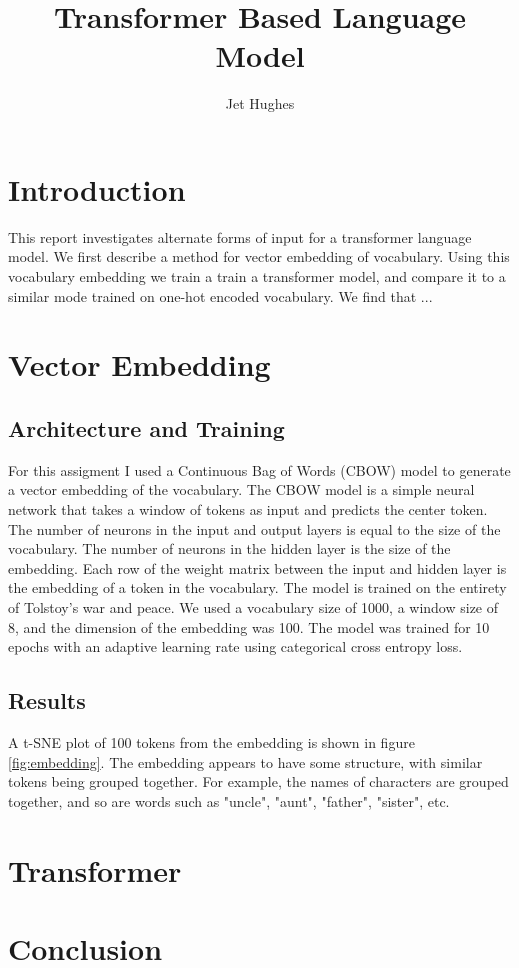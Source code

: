 \documentclass[a4paper, 11pt]{article}
\title{Transformer Based Language Model}
\author{Jet Hughes}
\date{}
\begin{document}
\maketitle


\section{Introduction}
This report investigates alternate forms of input for a transformer language model. We first describe a method for vector embedding of vocabulary. Using this vocabulary embedding we train a train a transformer model, and compare it to a similar mode trained on one-hot encoded vocabulary. We find that ...
\section{Vector Embedding}
\subsection{Architecture and Training}
For this assigment I used a Continuous Bag of Words (CBOW) model to generate a vector embedding of the vocabulary. The CBOW model is a simple neural network that takes a window of tokens as input and predicts the center token. The number of neurons in the input and output layers is equal to the size of the vocabulary. The number of neurons in the hidden layer is the size of the embedding. Each row of the weight matrix between the input and hidden layer is the embedding of a token in the vocabulary. The model is trained on the entirety of Tolstoy's war and peace. We used a vocabulary size of 1000, a window size of 8, and the dimension of the embedding was 100. The model was trained for 10 epochs with an adaptive learning rate using categorical cross entropy loss.

\subsection{Results}
A t-SNE plot of 100 tokens from the embedding is shown in figure \ref{fig:embedding}. The embedding appears to have some structure, with similar tokens being grouped together. For example, the names of characters are grouped together, and so are words such as "uncle", "aunt", "father", "sister", etc.

\section{Transformer}

\section{Conclusion}

% 
% 
\end{document}

